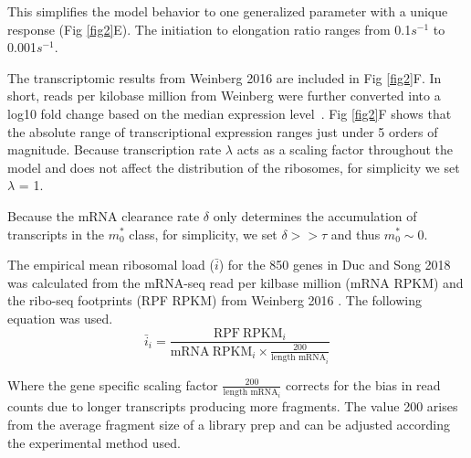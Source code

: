 \documentclass[10pt,letterpaper]{article}
\newcommand{\MRL}{\ensuremath{\bar{i}}\xspace}
\begin{document}
This simplifies the model behavior to one generalized parameter with a unique response (Fig \ref{fig2}E).  The initiation to elongation ratio ranges from 0.1$s^{-1}$ to 0.001$s^{-1}$.

The transcriptomic results from Weinberg 2016 are included in Fig \ref{fig2}F. In short, reads per kilobase million from Weinberg were further converted into a log10 fold change based on the median expression level~\cite{RN29}. Fig \ref{fig2}F shows that the absolute range of transcriptional expression ranges just under 5 orders of magnitude. Because transcription rate $\lambda$ acts as a scaling factor throughout the model and does not affect the distribution of the ribosomes, for simplicity we set $\lambda$ = 1.

Because the mRNA clearance rate $\delta$ only determines the accumulation of transcripts in the  $m_0^*$  class, for simplicity, we set $\delta >> \tau$ and thus  $m_0^* \sim 0$.
 
The empirical mean ribosomal load (\MRL) for the 850 genes in Duc and Song 2018 was calculated from the mRNA-seq read per kilbase million (mRNA RPKM) and the ribo-seq footprints (RPF RPKM) from Weinberg  2016 \cite{RN29}. The following equation was used.
\begin{equation}\label{eq:MRL}
	\MRL_i = \frac{\text{RPF} \: \text{RPKM}_i}{\text{mRNA} \:  \text{RPKM}_i  \times \frac{200}{\text{length mRNA}_i}}
\end{equation}

Where the gene specific scaling factor $\frac{200}{\text{length mRNA}_i}$ corrects for the bias in read counts due to longer transcripts producing more fragments. The value 200 arises from the average fragment size of a library prep and can be adjusted according the experimental method used.



\end{document}
